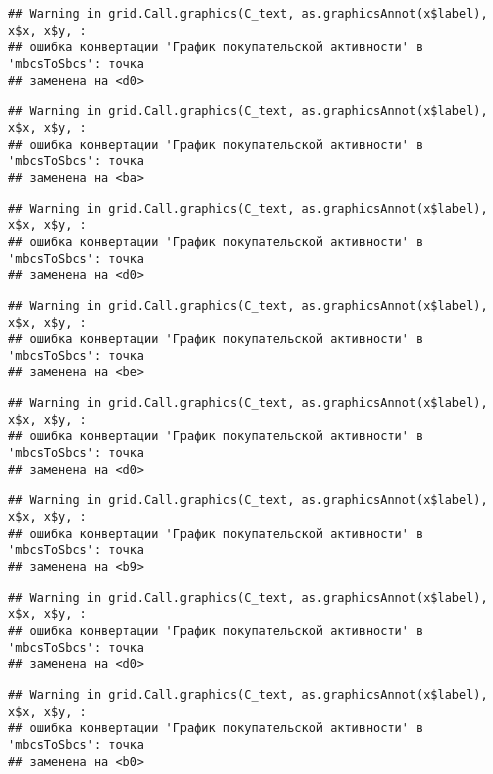 \documentclass[
]{article}
\begin{document}
\begin{verbatim}
## Warning in grid.Call.graphics(C_text, as.graphicsAnnot(x$label), x$x, x$y, :
## ошибка конвертации 'График покупательской активности' в 'mbcsToSbcs': точка
## заменена на <d0>
\end{verbatim}

\begin{verbatim}
## Warning in grid.Call.graphics(C_text, as.graphicsAnnot(x$label), x$x, x$y, :
## ошибка конвертации 'График покупательской активности' в 'mbcsToSbcs': точка
## заменена на <ba>
\end{verbatim}

\begin{verbatim}
## Warning in grid.Call.graphics(C_text, as.graphicsAnnot(x$label), x$x, x$y, :
## ошибка конвертации 'График покупательской активности' в 'mbcsToSbcs': точка
## заменена на <d0>
\end{verbatim}

\begin{verbatim}
## Warning in grid.Call.graphics(C_text, as.graphicsAnnot(x$label), x$x, x$y, :
## ошибка конвертации 'График покупательской активности' в 'mbcsToSbcs': точка
## заменена на <be>
\end{verbatim}

\begin{verbatim}
## Warning in grid.Call.graphics(C_text, as.graphicsAnnot(x$label), x$x, x$y, :
## ошибка конвертации 'График покупательской активности' в 'mbcsToSbcs': точка
## заменена на <d0>
\end{verbatim}

\begin{verbatim}
## Warning in grid.Call.graphics(C_text, as.graphicsAnnot(x$label), x$x, x$y, :
## ошибка конвертации 'График покупательской активности' в 'mbcsToSbcs': точка
## заменена на <b9>
\end{verbatim}

\begin{verbatim}
## Warning in grid.Call.graphics(C_text, as.graphicsAnnot(x$label), x$x, x$y, :
## ошибка конвертации 'График покупательской активности' в 'mbcsToSbcs': точка
## заменена на <d0>
\end{verbatim}

\begin{verbatim}
## Warning in grid.Call.graphics(C_text, as.graphicsAnnot(x$label), x$x, x$y, :
## ошибка конвертации 'График покупательской активности' в 'mbcsToSbcs': точка
## заменена на <b0>
\end{verbatim}
\end{document}
